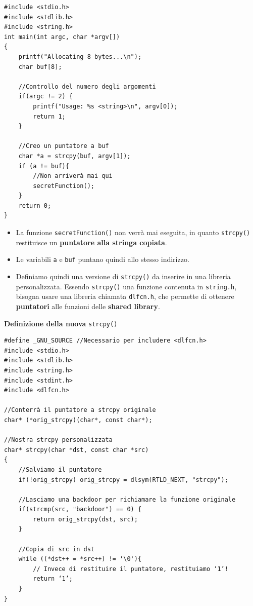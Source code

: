 \documentclass{article}
\begin{document}
\begin{minipage}{0.50\textwidth}
\begin{verbatim}
#include <stdio.h>
#include <stdlib.h>
#include <string.h>
int main(int argc, char *argv[])
{
	printf("Allocating 8 bytes...\n");
	char buf[8];
	
	//Controllo del numero degli argomenti
	if(argc != 2) {
		printf("Usage: %s <string>\n", argv[0]);
		return 1;
	}
	
	//Creo un puntatore a buf
	char *a = strcpy(buf, argv[1]);
	if (a != buf){
		//Non arriverà mai qui
		secretFunction();
	}
	return 0;
}
\end{verbatim}
\end{minipage}
\quad
\begin{minipage}{0.46\textwidth}
\begin{itemize}
	\item La funzione \verb|secretFunction()| non verrà mai eseguita, in quanto \verb|strcpy()| restituisce un \textbf{puntatore alla stringa copiata}.\\
	\item Le variabili \verb|a| e \verb|buf| puntano quindi allo stesso indirizzo.\\
	\item Definiamo quindi una versione di \verb|strcpy()| da inserire in una libreria personalizzata. Essendo \verb|strcpy()| una funzione contenuta in \verb|string.h|, bisogna usare una libreria chiamata \verb|dlfcn.h|, che permette di ottenere \textbf{puntatori} alle funzioni delle \textbf{shared library}.
\end{itemize}
\end{minipage}
\newpage

\textbf{Definizione della nuova} \verb|strcpy()|

\begin{verbatim}
#define _GNU_SOURCE //Necessario per includere <dlfcn.h>
#include <stdio.h>
#include <stdlib.h>
#include <string.h>
#include <stdint.h>
#include <dlfcn.h> 

//Conterrà il puntatore a strcpy originale
char* (*orig_strcpy)(char*, const char*);

//Nostra strcpy personalizzata
char* strcpy(char *dst, const char *src)
{ 
	//Salviamo il puntatore
	if(!orig_strcpy) orig_strcpy = dlsym(RTLD_NEXT, "strcpy"); 
	
	//Lasciamo una backdoor per richiamare la funzione originale
	if(strcmp(src, "backdoor") == 0) { 
		return orig_strcpy(dst, src);
	}
	
	//Copia di src in dst
	while ((*dst++ = *src++) != '\0'){
		// Invece di restituire il puntatore, restituiamo ‘1’!
		return ‘1’;	
	} 
}
\end{verbatim}
\end{document}

